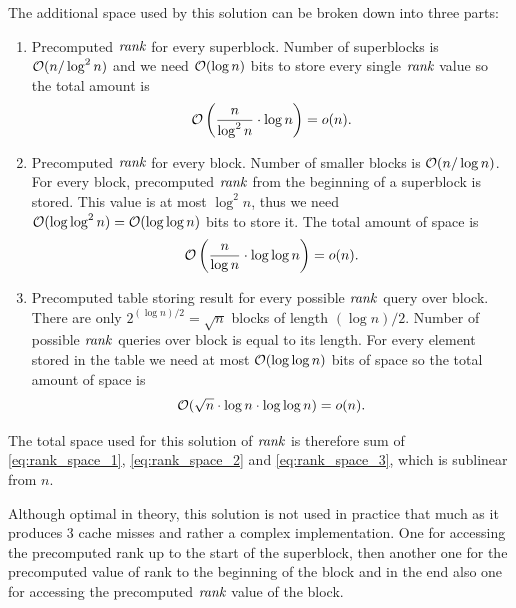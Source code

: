 The additional space used by this solution can be broken down into three parts:
\begin{enumerate}
    \item Precomputed $\mathit{rank}$ for every superblock. Number of superblocks is $\mathcal{O}(n/\log^2 n)$
    and we need $\mathcal{O}(\log n)$ bits to store every single $\mathit{rank}$ value so the total amount is
    \begin{equation}
        \mathcal{O}\left(\frac{n}{\log^2 n}\cdot \log n\right) = o(n).
        \label{eq:rank_space_1}
    \end{equation}
    \item Precomputed $\mathit{rank}$ for every block. Number of smaller blocks is $\mathcal{O}(n/\log n)$. For every
    block, precomputed $\mathit{rank}$ from the beginning of a superblock is stored. This value is at most $\log^2 n$,
    thus we need $\mathcal{O}(\log\log^2 n)=\mathcal{O}(\log\log n)$ bits to store it. The total amount of space is
    \begin{equation}
        \mathcal{O}\left(\frac{n}{\log n}\cdot \log\log n\right)=o(n).
        \label{eq:rank_space_2}
    \end{equation}
    \item Precomputed table storing result for every possible $\mathit{rank}$ query over block. There are only
    $2^{(\log n)/2} = \sqrt{n}$ blocks of length $(\log n)/2$. Number of possible $\mathit{rank}$ queries over
    block is equal to its length. For every element stored in the table we need at most $\mathcal{O}(\log\log n)$
    bits of space so the total amount of space is
    \begin{equation}
        \mathcal{O}(\sqrt{n}\cdot \log n\cdot \log\log n)=o(n).
        \label{eq:rank_space_3}
    \end{equation}
\end{enumerate}

The total space used for this solution of $\mathit{rank}$ is therefore sum of \ref{eq:rank_space_1}, \ref{eq:rank_space_2} and
\ref{eq:rank_space_3}, which is sublinear from $n$.

Although optimal in theory, this solution is not used in practice that much as it produces
3 cache misses and rather a complex implementation. One for accessing the precomputed rank up
to the start of the superblock, then another one for the precomputed value of rank to the
beginning of the block and in the end also one for accessing the precomputed $\mathit{rank}$ value
of the block.


